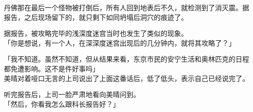 丹佛那在最后一个怪物被打倒后，所有人回到地表后不久，就检测到了消灭震。据报告，之后现场留下的，就只剩下如同坍塌后洞穴的痕迹了。

据报告，被攻略完毕的浅深度迷宫当时也发生了类似的现象。\\

「你是想说，有一个人，在深深度迷宫出现后的几分钟内，就将其攻略了？」

「我不知道。虽然不知道，但从结果来看，东京市民的安宁生活和奥林匹克的日程都免遭影响。这不是件好事吗」\\

美晴对着哑口无言的上司说出了上面这番话后，低了低头，表示自己已经说完了。

听完报告后，上司一脸严肃地看向美晴问到。\\

「然后，你看我怎么跟科长报告好？」\\
